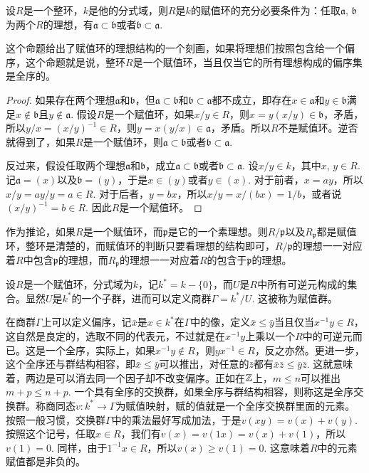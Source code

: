 \begin{pro}
设$R$是一个整环，$k$是他的分式域，则$R$是$k$的赋值环的充分必要条件为：任取$\mathfrak{a}$, $\mathfrak{b}$为两个$R$的理想，有$\mathfrak{a}\subset \mathfrak{b}$或者$\mathfrak{b}\subset \mathfrak{a}$. 
\end{pro}

这个命题给出了赋值环的理想结构的一个刻画，如果将理想们按照包含给一个偏序，这个命题就是说，整环$R$是一个赋值环，当且仅当它的所有理想构成的偏序集是全序的。

\begin{proof}
	如果存在两个理想$\mathfrak{a}$和$\mathfrak{b}$，但$\mathfrak{a}\subset \mathfrak{b}$和$\mathfrak{b}\subset \mathfrak{a}$都不成立，即存在$x\in \mathfrak{a}$和$y\in \mathfrak{b}$满足$x\not\in \mathfrak{b}$且$y\not\in \mathfrak{a}$. 假设$R$是一个赋值环，如果$x/y\in R$，则$x=y(x/y)\in \mathfrak{b}$，矛盾，所以$y/x=(x/y)^{-1}\in R$，则$y=x(y/x)\in\mathfrak{a}$，矛盾。所以$R$不是赋值环。逆否就得到了，如果$R$是一个赋值环，则$\mathfrak{a}\subset \mathfrak{b}$或者$\mathfrak{b}\subset \mathfrak{a}$.

	反过来，假设任取两个理想$\mathfrak{a}$和$\mathfrak{b}$，成立$\mathfrak{a}\subset \mathfrak{b}$或者$\mathfrak{b}\subset \mathfrak{a}$. 设$x/y\in k$，其中$x$, $y\in R$. 记$\mathfrak{a}=(x)$以及$\mathfrak{b}=(y)$，于是$x\in (y)$或者$y\in (x)$. 对于前者，$x=ay$，所以$x/y=ay/y=a\in R$. 对于后者，$y=bx$，所以$x/y=x/(bx)=1/b$，或者说$(x/y)^{-1}=b\in R$. 因此$R$是一个赋值环。
\end{proof}

作为推论，如果$R$是一个赋值环，而$\mathfrak{p}$是它的一个素理想。则$R/\mathfrak{p}$以及$R_{\mathfrak{p}}$都是赋值环，整环是清楚的，而赋值环的判断只要看理想的结构即可，$R/\mathfrak{p}$的理想一一对应着$R$中包含$\mathfrak{p}$的理想，而$R_{\mathfrak{p}}$的理想一一对应着$R$的包含于$\mathfrak{p}$的理想。

\para[赋值群] 设$R$是一个赋值环，分式域为$k$，记$k^*=k-\{0\}$，而$U$是$R$中所有可逆元构成的集合。显然$U$是$k^*$的一个子群，进而可以定义商群$\Gamma=k^*/U$. 这被称为赋值群。

在商群$\Gamma$上可以定义偏序，记$\bar{x}$是$x\in k^*$在$\Gamma$中的像，定义$\bar{x}\leq \bar{y}$当且仅当$x^{-1}y\in R$，这自然是良定的，选取不同的代表元，不过就是在$x^{-1}y$上乘以一个$R$中的可逆元而已。这是一个全序，实际上，如果$x^{-1}y\not\in R$，则$yx^{-1}\in R$，反之亦然。更进一步，这个全序还与群结构相容，即$\bar{x}\leq \bar{y}$可以推出，对任意的$\bar{z}$都有$\bar{x}\bar{z}\leq \bar{y}\bar{z}$. 这就意味着，两边是可以消去同一个因子却不改变偏序。正如在$\mathbb{Z}$上，$m\leq n$可以推出$m+p\leq n+p$. 一个具有全序的交换群，如果全序与群结构相容，则称这是全序交换群。称商同态$v:k^*\to\Gamma$为赋值映射，赋的值就是一个全序交换群里面的元素。按照一般习惯，交换群$\Gamma$中的乘法最好写成加法，于是$v(xy)=v(x)+v(y)$. 按照这个记号，任取$x\in R$，我们有$v(x)=v(1x)=v(x)+v(1)$，所以$v(1)=0$. 同样，由于$1^{-1}x\in R$，所以$v(x)\geq v(1)=0$. 这意味着$R$中的元素赋值都是非负的。

